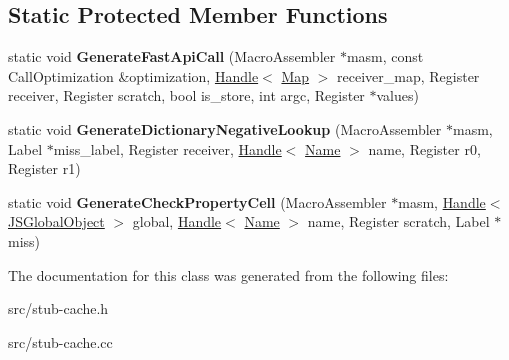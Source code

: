 \subsection*{Static Protected Member Functions}
\begin{DoxyCompactItemize}
\item 
\hypertarget{classv8_1_1internal_1_1_property_handler_compiler_add52b371fc33950829ef5a09eb2fc0e9}{}static void {\bfseries Generate\+Fast\+Api\+Call} (Macro\+Assembler $\ast$masm, const Call\+Optimization \&optimization, \hyperlink{classv8_1_1internal_1_1_handle}{Handle}$<$ \hyperlink{classv8_1_1internal_1_1_map}{Map} $>$ receiver\+\_\+map, Register receiver, Register scratch, bool is\+\_\+store, int argc, Register $\ast$values)\label{classv8_1_1internal_1_1_property_handler_compiler_add52b371fc33950829ef5a09eb2fc0e9}

\item 
\hypertarget{classv8_1_1internal_1_1_property_handler_compiler_abee80afea50a5a66ac6b69dcc46a2c96}{}static void {\bfseries Generate\+Dictionary\+Negative\+Lookup} (Macro\+Assembler $\ast$masm, Label $\ast$miss\+\_\+label, Register receiver, \hyperlink{classv8_1_1internal_1_1_handle}{Handle}$<$ \hyperlink{classv8_1_1internal_1_1_name}{Name} $>$ name, Register r0, Register r1)\label{classv8_1_1internal_1_1_property_handler_compiler_abee80afea50a5a66ac6b69dcc46a2c96}

\item 
\hypertarget{classv8_1_1internal_1_1_property_handler_compiler_ae56b23f38944af3bf62d7edcb66adfb3}{}static void {\bfseries Generate\+Check\+Property\+Cell} (Macro\+Assembler $\ast$masm, \hyperlink{classv8_1_1internal_1_1_handle}{Handle}$<$ \hyperlink{classv8_1_1internal_1_1_j_s_global_object}{J\+S\+Global\+Object} $>$ global, \hyperlink{classv8_1_1internal_1_1_handle}{Handle}$<$ \hyperlink{classv8_1_1internal_1_1_name}{Name} $>$ name, Register scratch, Label $\ast$miss)\label{classv8_1_1internal_1_1_property_handler_compiler_ae56b23f38944af3bf62d7edcb66adfb3}

\end{DoxyCompactItemize}


The documentation for this class was generated from the following files\+:\begin{DoxyCompactItemize}
\item 
src/stub-\/cache.\+h\item 
src/stub-\/cache.\+cc\end{DoxyCompactItemize}
